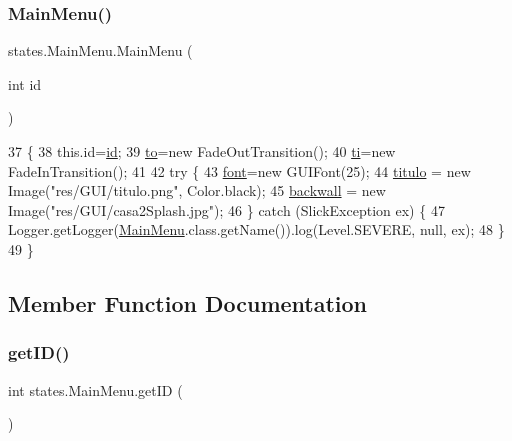 \subsubsection{\texorpdfstring{Main\+Menu()}{MainMenu()}}
{\footnotesize\ttfamily states.\+Main\+Menu.\+Main\+Menu (\begin{DoxyParamCaption}\item[{int}]{id }\end{DoxyParamCaption})\hspace{0.3cm}{\ttfamily [inline]}}


\begin{DoxyCode}
37                            \{
38         this.\textcolor{keywordtype}{id}=\mbox{\hyperlink{classstates_1_1_main_menu_acdd02005ac38a76e9d4e5bca1e33fb4c}{id}};
39         \mbox{\hyperlink{classstates_1_1_main_menu_a7443336a416646891958e073289b2a50}{to}}=\textcolor{keyword}{new} FadeOutTransition();
40         \mbox{\hyperlink{classstates_1_1_main_menu_ab7c88b387c4beb4042ffd45d6b513c23}{ti}}=\textcolor{keyword}{new} FadeInTransition();
41 
42         \textcolor{keywordflow}{try} \{
43             \mbox{\hyperlink{classstates_1_1_main_menu_a045edf02b97294df356a8101adaa11c3}{font}}=\textcolor{keyword}{new} GUIFont(25);
44             \mbox{\hyperlink{classstates_1_1_main_menu_a185de536bd7c3e47f5c7ade14b27dc84}{titulo}} = \textcolor{keyword}{new} Image(\textcolor{stringliteral}{"res/GUI/titulo.png"}, Color.black);
45             \mbox{\hyperlink{classstates_1_1_main_menu_a0203042667da8aea22930eb0810d5d9d}{backwall}} = \textcolor{keyword}{new} Image(\textcolor{stringliteral}{"res/GUI/casa2Splash.jpg"});
46         \} \textcolor{keywordflow}{catch} (SlickException ex) \{
47             Logger.getLogger(\mbox{\hyperlink{classstates_1_1_main_menu_adc73381b13644459bfc6502313f80241}{MainMenu}}.class.getName()).log(Level.SEVERE, null, ex);
48         \}
49     \}
\end{DoxyCode}


\subsection{Member Function Documentation}
\mbox{\label{classstates_1_1_main_menu_adbf17a27cb74ddf0365ca09fd0758b3f}} 
\subsubsection{\texorpdfstring{get\+I\+D()}{getID()}}
{\footnotesize\ttfamily int states.\+Main\+Menu.\+get\+ID (\begin{DoxyParamCaption}{ }\end{DoxyParamCaption})\hspace{0.3cm}{\ttfamily [inline]}}

